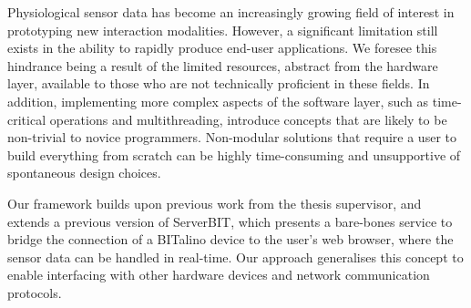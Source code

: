 
Physiological sensor data has become an increasingly growing field of interest in prototyping new interaction modalities. However, a significant limitation still exists in the ability to rapidly produce end-user applications\cite{alves_signalbit:_2013}. We foresee this hindrance being a result of the limited resources, abstract from the hardware layer, available to those who are not technically proficient in these fields. In addition, implementing more complex aspects of the software layer, such as time-critical operations and multithreading, introduce concepts that are likely to be non-trivial to novice programmers. Non-modular solutions that require a user to build everything from scratch can be highly time-consuming and unsupportive of spontaneous design choices.


Our framework builds upon previous work from the thesis supervisor, \citeauthor{da_silva_web-based_2012} \cite{da_silva_web-based_2012,da_silva_bit:_2014} and extends a previous version of ServerBIT, which presents a bare-bones service to bridge the connection of a BITalino device to the user's web browser, where the sensor data can be handled in real-time. Our approach generalises this concept to enable interfacing with other hardware devices and network communication protocols.


